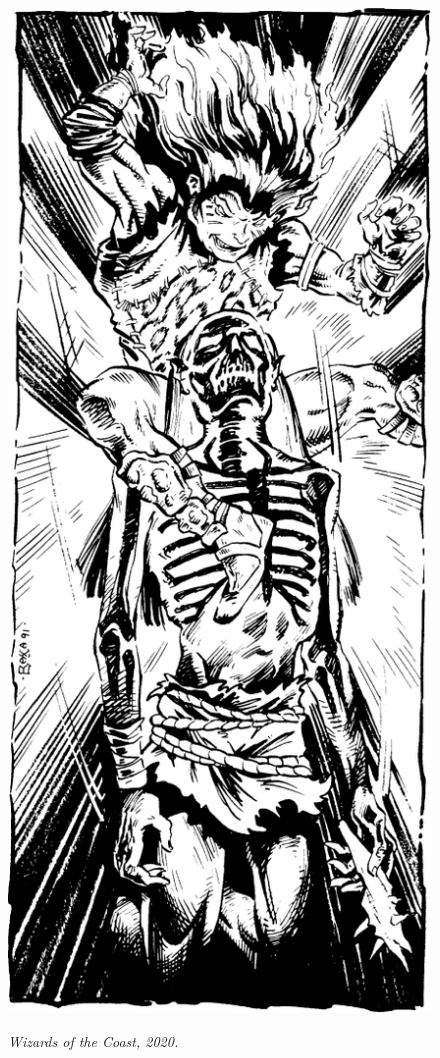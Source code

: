 \begin{figure}[t!]
\centering
\includegraphics[width=\columnwidth]{images/psionic-1.png}
\par\textit{\small\textcopyright Wizards of the Coast, 2020.}
\end{figure}

